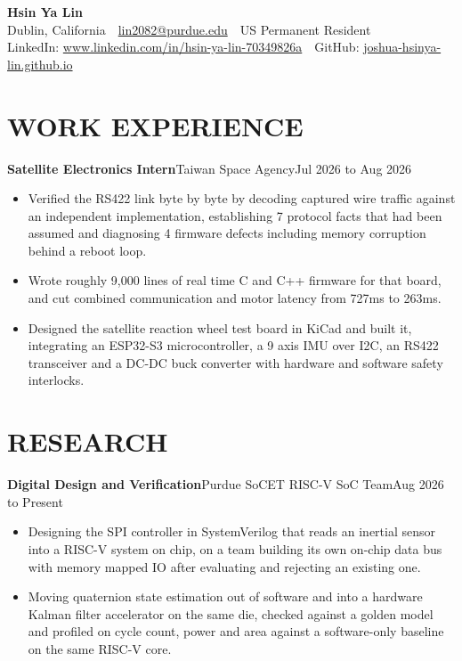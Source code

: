 \documentclass[11pt]{article}
\newcommand{\entry}[3]{\noindent\textbf{#1}\hspace{0.45em}\textbar\hspace{0.45em}#2\hspace{0.45em}\textbar\hspace{0.45em}#3\par}
\begin{document}
\begin{center}
    {\LARGE\bfseries Hsin Ya Lin}\\[3pt]
    Dublin, California \,\textbar\, \href{mailto:lin2082@purdue.edu}{lin2082@purdue.edu} \,\textbar\, US Permanent Resident\\[2pt]
    LinkedIn: \href{https://www.linkedin.com/in/hsin-ya-lin-70349826a}{www.linkedin.com/in/hsin-ya-lin-70349826a} \,\textbar\, GitHub: \href{https://joshua-hsinya-lin.github.io}{joshua-hsinya-lin.github.io}
\end{center}


\section{WORK EXPERIENCE}

\entry{Satellite Electronics Intern}{Taiwan Space Agency}{Jul 2026 to Aug 2026}
\begin{itemize}
    \item Verified the RS422 link byte by byte by decoding captured wire traffic against an independent implementation, establishing 7 protocol facts that had been assumed and diagnosing 4 firmware defects including memory corruption behind a reboot loop. %
    \item Wrote roughly 9,000 lines of real time C and C++ firmware for that board, and cut combined communication and motor latency from 727ms to 263ms. %
    \item Designed the satellite reaction wheel test board in KiCad and built it, integrating an ESP32-S3 microcontroller, a 9 axis IMU over I2C, an RS422 transceiver and a DC-DC buck converter with hardware and software safety interlocks. %
\end{itemize}


\section{RESEARCH}

\entry{Digital Design and Verification}{Purdue SoCET RISC-V SoC Team}{Aug 2026 to Present}
\begin{itemize}
    \item Designing the SPI controller in SystemVerilog that reads an inertial sensor into a RISC-V system on chip, on a team building its own on-chip data bus with memory mapped IO after evaluating and rejecting an existing one. %
    \item Moving quaternion state estimation out of software and into a hardware Kalman filter accelerator on the same die, checked against a golden model and profiled on cycle count, power and area against a software-only baseline on the same RISC-V core. %
\end{itemize}
\end{document}
